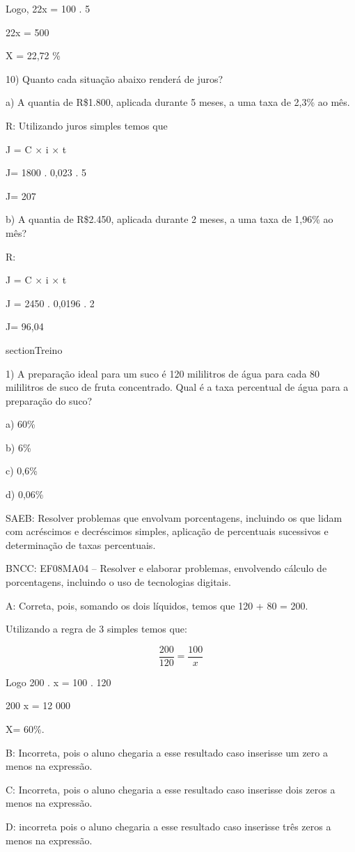 Logo, 22x = 100 . 5

22x = 500

X = 22,72 \%

10) Quanto cada situação abaixo renderá de juros?

a) A quantia de R\$1.800, aplicada durante 5 meses, a uma taxa de 2,3\%
ao mês.

R: Utilizando juros simples temos que

J = C × i × t

J= 1800 . 0,023 . 5

J= 207

b) A quantia de R\$2.450, aplicada durante 2 meses, a uma taxa de 1,96\%
ao mês?

R:

J = C × i × t

J = 2450 . 0,0196 . 2

J= 96,04

section{Treino}

1) A preparação ideal para um suco é 120 mililitros de água para cada 80
mililitros de suco de fruta concentrado. Qual é a taxa percentual de
água para a preparação do suco?

a) 60\%

b) 6\%

c) 0,6\%

d) 0,06\%

SAEB: Resolver problemas que envolvam porcentagens, incluindo os que
lidam com acréscimos e decréscimos simples, aplicação de percentuais
sucessivos e determinação de taxas percentuais.

BNCC: EF08MA04 -- Resolver e elaborar problemas, envolvendo cálculo de
porcentagens, incluindo o uso de tecnologias digitais.

A: Correta, pois, somando os dois líquidos, temos que 120 + 80 = 200.

Utilizando a regra de 3 simples temos que:

\[\frac {200}{120} = \frac {100}{x}\]

Logo 200 . x = 100 . 120

200 x = 12 000

X= 60\%.

B: Incorreta, pois o aluno chegaria a esse resultado caso inserisse um
zero a menos na expressão.

C: Incorreta, pois o aluno chegaria a esse resultado caso inserisse dois
zeros a menos na expressão.

D: incorreta pois o aluno chegaria a esse resultado caso inserisse três
zeros a menos na expressão.

